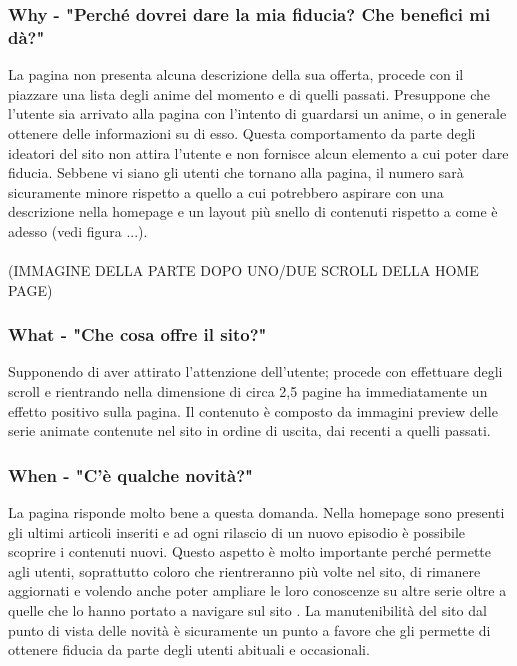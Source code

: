 \subsubsection{Why - "Perché dovrei dare la mia fiducia? Che benefici mi dà?"} \label{HWhy}
La pagina non presenta alcuna descrizione della sua offerta, procede con il piazzare una lista degli anime del momento e di quelli passati. Presuppone che l'utente sia arrivato alla pagina con l'intento di guardarsi un anime, o in generale ottenere delle informazioni su di esso. Questa comportamento da parte degli ideatori del sito non attira l'utente e non fornisce alcun elemento a cui poter dare fiducia. Sebbene vi siano gli utenti che tornano alla pagina, il numero sarà sicuramente minore rispetto a quello a cui potrebbero aspirare con una descrizione nella homepage e un layout più snello di contenuti rispetto a come è adesso (vedi figura ...).
\\
\\
(IMMAGINE DELLA PARTE DOPO UNO/DUE SCROLL DELLA HOME PAGE)


\subsubsection{What - "Che cosa offre il sito?"} \label{HWhat}
Supponendo di aver attirato l'attenzione dell'utente; procede con effettuare degli scroll e rientrando nella dimensione di circa 2,5 pagine ha immediatamente un effetto positivo sulla pagina. Il contenuto è composto da immagini preview delle serie animate contenute nel sito in ordine di uscita, dai recenti a quelli passati. 

\subsubsection{When - "C'è qualche novità?"} \label{HWhen}
La pagina risponde molto bene a questa domanda. Nella homepage sono presenti gli ultimi articoli inseriti e ad ogni rilascio di un nuovo episodio è possibile scoprire i contenuti nuovi.
Questo aspetto è molto importante perché permette agli utenti, soprattutto coloro che rientreranno più volte nel sito, di rimanere aggiornati e volendo anche poter ampliare le loro conoscenze su altre serie oltre a quelle che lo hanno portato a navigare sul sito \nomeSito. La manutenibilità del sito dal punto di vista delle novità è sicuramente un punto a favore che gli permette di ottenere fiducia da parte degli utenti abituali e occasionali.


